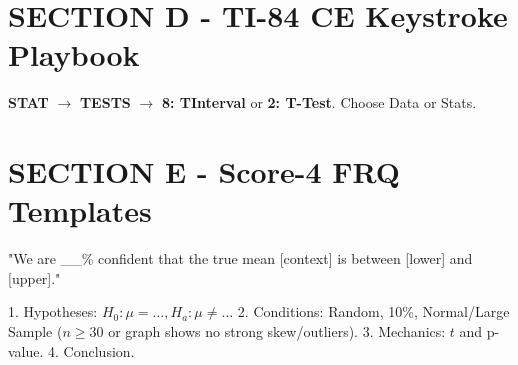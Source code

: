 \section{SECTION D - TI-84 CE Keystroke Playbook}
\begin{calculatorbox}
\textbf{STAT} $\rightarrow$ \textbf{TESTS} $\rightarrow$ \textbf{8: TInterval} or \textbf{2: T-Test}. Choose Data or Stats.
\end{calculatorbox}

\section{SECTION E - Score-4 FRQ Templates}
\begin{frqrubricbox}
"We are \_\_\% confident that the true mean [context] is between [lower] and [upper]."
\end{frqrubricbox}
\begin{frqrubricbox}
1. Hypotheses: $H_0: \mu = \dots, H_a: \mu \neq \dots$
2. Conditions: Random, 10\%, Normal/Large Sample ($n \geq 30$ or graph shows no strong skew/outliers).
3. Mechanics: $t$ and p-value.
4. Conclusion.
\end{frqrubricbox}

